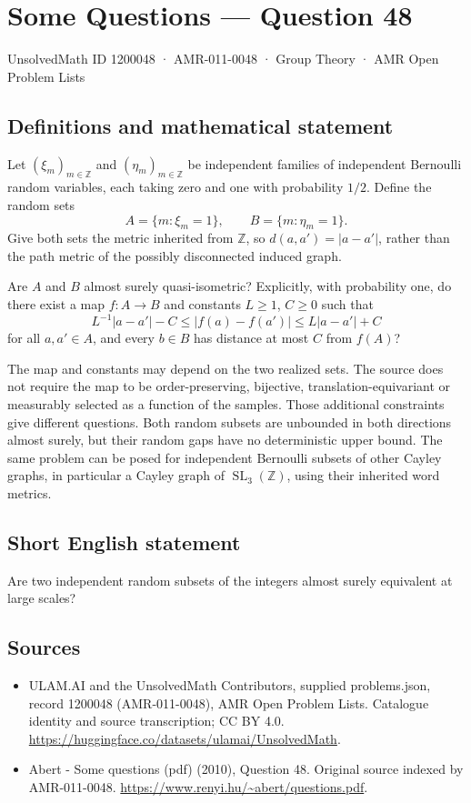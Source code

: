 \documentclass[11pt,a4paper]{article}
\begin{document}
\section*{Some Questions — Question 48}\label{1200048}
{\small UnsolvedMath ID 1200048 · AMR-011-0048 · Group Theory · AMR Open Problem Lists}
\subsection{Definitions and mathematical statement}
Let $(\xi_m)_{m\in\mathbb Z}$ and $(\eta_m)_{m\in\mathbb Z}$ be independent families of independent Bernoulli random variables, each taking zero and one with probability $1/2$. Define the random sets
\[
 A=\{m:\xi_m=1\},\qquad B=\{m:\eta_m=1\}.
\]
Give both sets the metric inherited from $\mathbb Z$, so $d(a,a')=|a-a'|$, rather than the path metric of the possibly disconnected induced graph.

Are $A$ and $B$ almost surely quasi-isometric? Explicitly, with probability one, do there exist a map $f:A\to B$ and constants $L\geq1$, $C\geq0$ such that
\[
 L^{-1}|a-a'|-C\leq |f(a)-f(a')|\leq L|a-a'|+C
\]
for all $a,a'\in A$, and every $b\in B$ has distance at most $C$ from $f(A)$?

The map and constants may depend on the two realized sets. The source does not require the map to be order-preserving, bijective, translation-equivariant or measurably selected as a function of the samples. Those additional constraints give different questions. Both random subsets are unbounded in both directions almost surely, but their random gaps have no deterministic upper bound. The same problem can be posed for independent Bernoulli subsets of other Cayley graphs, in particular a Cayley graph of $\operatorname{SL}_3(\mathbb Z)$, using their inherited word metrics.
\subsection{Short English statement}
Are two independent random subsets of the integers almost surely equivalent at large scales?
\subsection{Sources}
\begin{itemize}
\item[S1] ULAM.AI and the UnsolvedMath Contributors, supplied problems.json, record 1200048 (AMR-011-0048), AMR Open Problem Lists. Catalogue identity and source transcription; CC BY 4.0.
\url{https://huggingface.co/datasets/ulamai/UnsolvedMath}.
\item[S2] Abert - Some questions (pdf) (2010), Question 48. Original source indexed by AMR-011-0048.
\url{https://www.renyi.hu/~abert/questions.pdf}.
\end{itemize}
\end{document}
